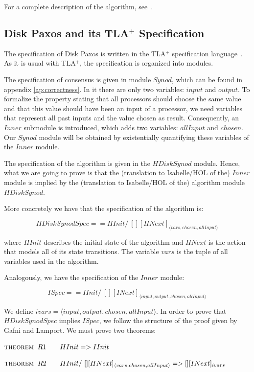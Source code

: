 For a complete description of the algorithm, see~\cite{Gafni00disk}.


\subsection{Disk Paxos and its TLA$^{+}$ Specification}

The specification of Disk Paxos is written in the TLA$^{+}$
specification language~\cite{LamportTLA:2002}. As it is usual with
TLA$^{+}$, the specification is organized into modules.

\tla The specification of consensus is given in module $Synod$, which
can be found in appendix \ref{ap:correctness}. In it there are only
two variables: $input$ and $output$. To formalize the property stating
that all processors should choose the same value and that this value
should have been an input of a processor, we need variables that
represent all past inputs and the value chosen as result.
Consequently, an $Inner$ submodule is introduced, which adds two
variables: $allInput$ and $chosen$. Our $Synod$ module will be obtained
by existentially quantifying these variables of the $Inner$ module.

The specification of the algorithm is given in the $HDiskSynod$
module.  Hence, what we are going to prove is that the (translation to
Isabelle/HOL of the) $Inner$ module is implied by the (translation to
Isabelle/HOL of the) algorithm module $HDiskSynod$.

More concretely we have that the specification of the algorithm is:

\[
HDiskSynodSpec == HInit /\ [] [HNext]_{\langle
  vars,chosen,allInput\rangle}\]

\noindent where $HInit$ describes the initial state of the algorithm
and $HNext$ is the action that models all of its state transitions.
The variable $vars$ is the tuple of all variables used in the
algorithm.

Analogously, we have the specification of the $Inner$ module:

\[
ISpec == IInit /\ [] [INext]_{\langle
  input,output,chosen,allInput\rangle}\]


We define $ivars=\langle input,output,chosen,allInput\rangle$. In
order to prove that $HDiskSynodSpec$ implies $ISpec$, we follow the
structure of the proof given by Gafni and Lamport. We must prove two
theorems:

\medskip{} $\mbox{\sc theorem }\, R1\qquad HInit => IInit$

$\mbox{\sc theorem }\, R2\qquad
HInit /\ [] [HNext]_{\langle
  vars,chosen,allInput\rangle} => [][INext]_{ivars}$
\medskip{}

